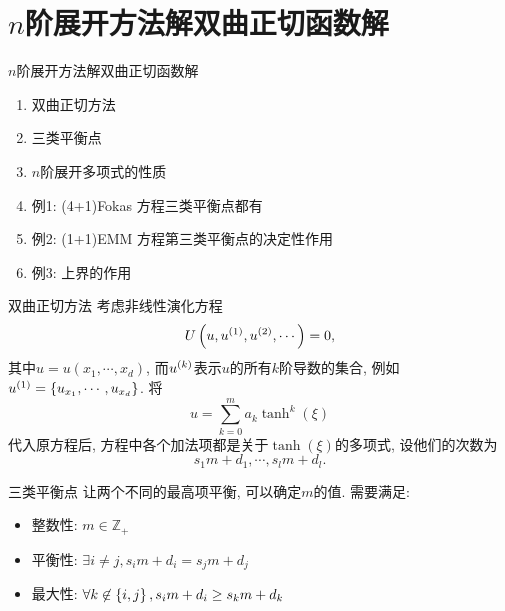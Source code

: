 \section{$n$阶展开方法解双曲正切函数解}
\begin{frame}{$n$阶展开方法解双曲正切函数解}
\begin{enumerate}
\item 双曲正切方法
\item 三类平衡点
\item $n$阶展开多项式的性质
\item 例1: (4+1)Fokas 方程三类平衡点都有
\item 例2: (1+1)EMM 方程第三类平衡点的决定性作用 
\item 例3: 上界的作用
\end{enumerate}
\end{frame}

\begin{frame}{双曲正切方法}
考虑非线性演化方程 
\[
    U\left(u,u^{(1)},u^{(2)},\cdots\right)=0, 
\]
其中$u=u(x_1,\cdots,x_d)$, 而$u^{(k)}$表示$u$的所有$k$阶导数的集合, 例如$u^{(1)}=\left\{u_{x_1},\cdots,u_{x_d}\right\}$. 
将
\[
    u=\sum_{k=0}^{m}{a_k\tanh^k(\xi)}
\]
代入原方程后, 方程中各个加法项都是关于$\tanh(\xi)$的多项式, 设他们的次数为 
\[
    s_1 m+d_1,\cdots,s_l m + d_l . 
\]
\end{frame}

\begin{frame}{三类平衡点}
让两个不同的最高项平衡, 可以确定$m$的值. 需要满足:
\begin{itemize}
    \item 整数性: $ m\in \mathbb Z_+$ 
    \item 平衡性: $\exists i\neq j, s_i m+d_i=s_j m+d_j $
    \item 最大性: $\forall k \not\in \left\{i,j\right\}, s_i m+d_i\ge s_k m+d_k $
\end{itemize}
\end{frame}


